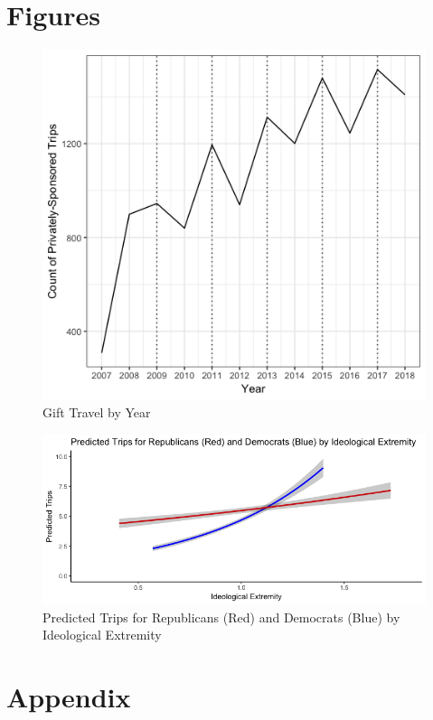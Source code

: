 \documentclass[12pt]{article}                           %
\begin{document}
\section*{\centering Figures}
\begin{figure}[hbt]
\centering
\includegraphics[scale=.55]{trend.png}
  \caption{Gift Travel by Year}
\end{figure}

\begin{figure}[hbt]
\centering
\includegraphics[scale=.55]{party+extremity.png}
  \caption{Predicted Trips for Republicans (Red) and Democrats (Blue) by Ideological Extremity}
\end{figure}



\newpage
\clearpage
\setcounter{table}{0}
\renewcommand{\thetable}{A\arabic{table}}
\setcounter{page}{1}
\section*{\centering Appendix}
\end{document}
